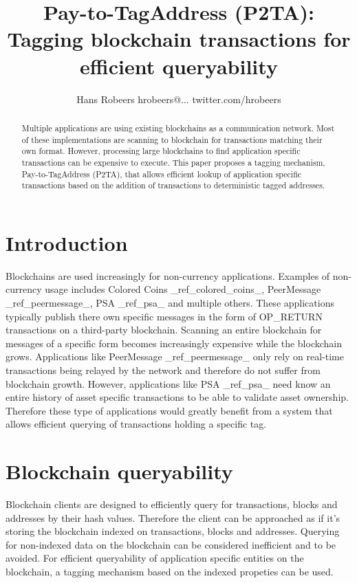 \documentclass[a4paper,10pt]{article}
\title{Pay-to-TagAddress (P2TA): Tagging blockchain transactions for efficient queryability}
\author{Hans Robeers hrobeers@... twitter.com/hrobeers}
\begin{document}
\maketitle

\begin{abstract}
Multiple applications are using existing blockchains as a communication network.
Most of these implementations are scanning to blockchain for transactions matching their own format.
However, processing large blockchains to find application specific transactions can be expensive to execute.
This paper proposes a tagging mechanism, Pay-to-TagAddress (P2TA), that allows efficient lookup of application specific transactions based on the addition of transactions to deterministic tagged addresses.
\end{abstract}

\section{Introduction}
Blockchains are used increasingly for non-currency applications.
Examples of non-currency usage includes Colored Coins \_ref\_colored\_coins\_, PeerMessage \_ref\_peermessage\_, PSA \_ref\_psa\_ and multiple others.
These applications typically publish there own specific messages in the form of OP\_RETURN transactions on a third-party blockchain.
Scanning an entire blockchain for messages of a specific form becomes increasingly expensive while the blockchain grows.
Applications like PeerMessage \_ref\_peermessage\_ only rely on real-time transactions being relayed by the network and therefore do not suffer from blockchain growth.
However, applications like PSA \_ref\_psa\_ need know an entire history of asset specific transactions to be able to validate asset ownership.
Therefore these type of applications would greatly benefit from a system that allows efficient querying of transactions holding a specific tag.

\section{Blockchain queryability}
Blockchain clients are designed to efficiently query for transactions, blocks and addresses by their hash values.
Therefore the client can be approached as if it's storing the blockchain indexed on transactions, blocks and addresses.
Querying for non-indexed data on the blockchain can be considered inefficient and to be avoided.
For efficient queryability of application specific entities on the blockchain, a tagging mechanism based on the indexed propeties can be used.
\end{document}
